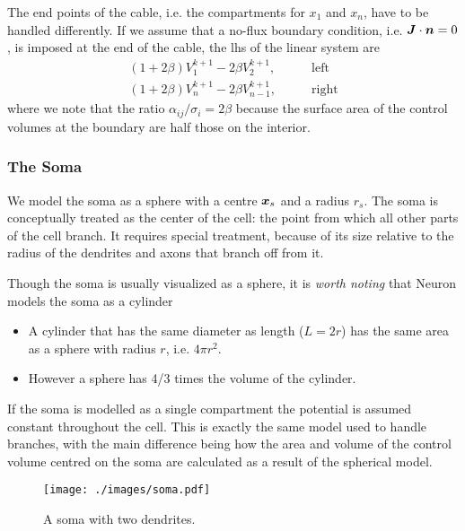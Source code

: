 The end points of the cable, i.e. the compartments for $x_1$ and $x_n$, have to be handled differently.
If we assume that a no-flux boundary condition, i.e. $\bm{J}\cdot\bm{n}=0$, is imposed at the end of the cable, the lhs of the linear system are
\begin{align}
    (1+2\beta)V_1^{k+1} - 2\beta V_{2}^{k+1}, \quad\quad & \text{left} \nonumber \\
    (1+2\beta)V_n^{k+1} - 2\beta V_{n-1}^{k+1}, \quad\quad & \text{right} \nonumber
\end{align}
where we note that the ratio $\alpha_{ij}/\sigma_{i}=2\beta$ because the surface area of the control volumes at the boundary are half those on the interior.

\subsubsection{The Soma}
We model the soma as a sphere with a centre $\bm{x}_s$ and a radius $r_s$.
The soma is conceptually treated as the center of the cell: the point from which all other parts of the cell branch.
It requires special treatment, because of its size relative to the radius of the dendrites and axons that branch off from it.

Though the soma is usually visualized as a sphere, it is \emph{worth noting} that Neuron models the soma as a cylinder
\begin{itemize}
    \item A cylinder that has the same diameter as length ($L=2r$) has the same area as a sphere with radius $r$, i.e. $4\pi r^2$.
    \item However a sphere has 4/3 times the volume of the cylinder.
\end{itemize}

If the soma is modelled as a single compartment the potential is assumed constant throughout the cell.
This is exactly the same model used to handle branches, with the main difference being how the area and volume of the control volume centred on the soma are calculated as a result of the spherical model.

\begin{figure}
    \begin{center}
        \texttt{[image: ./images/soma.pdf]}
    \end{center}
    \caption{A soma with two dendrites.}
    \label{fig:soma}
\end{figure}

